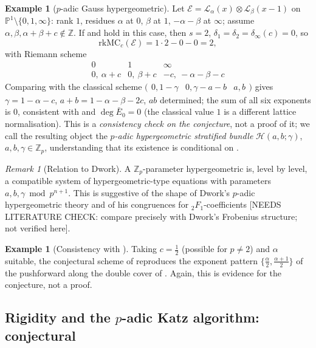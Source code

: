 \documentclass[11pt,reqno]{amsart}
\newcommand{\NEEDSLITERATURECHECK}[1]{{\color{green!40!black}\textsf{[NEEDS
LITERATURE CHECK: #1]}}}
\newcommand{\Zp}{\mathbb{Z}_p}
\newcommand{\ZZ}{\mathbb{Z}}
\newcommand{\PP}{\mathbb{P}}
\newcommand{\cE}{\mathcal{E}}
\newcommand{\cL}{\mathcal{L}}
\newcommand{\cH}{\mathcal{H}}
\newcommand{\rk}{\mathrm{rk}}
\newcommand{\MC}{\mathrm{MC}}
\theoremstyle{plain}
\theoremstyle{definition}
\newtheorem{example}[theorem]{Example}
\theoremstyle{remark}
\newtheorem{remark}[theorem]{Remark}
\numberwithin{equation}{section}
\begin{document}
\begin{example}[$p$-adic Gauss hypergeometric]\label{ex:2F1}
Let $\cE=\cL_{\alpha}(x)\otimes\cL_{\beta}(x-1)$ on
$\PP^1\setminus\{0,1,\infty\}$: rank $1$, residues $\alpha$ at $0$,
$\beta$ at $1$, $-\alpha-\beta$ at $\infty$; assume
$\alpha,\beta,\alpha+\beta+c\notin\ZZ$.  If  and
 hold in this case, then $s=2$,
$\delta_1=\delta_2=\delta_\infty(c)=0$, so
\[
   \rk\MC_c(\cE)=1\cdot2-0-0=2,
\]
with Riemann scheme
\[
   \begin{array}{c|c|c}
   0 & 1 & \infty\\\hline
   0,\ \alpha+c & 0,\ \beta+c & -c,\ -\alpha-\beta-c
   \end{array}
\]
Comparing with the classical scheme
$\bigl(\begin{smallmatrix}0,1-\gamma&0,\gamma-a-b&a,b\end{smallmatrix}\bigr)$
gives $\gamma=1-\alpha-c$, $a+b=1-\alpha-\beta-2c$, $ab$ determined; the
sum of all six exponents is $0$, consistent with
 and $\deg\bar E_0=0$ (the classical value $1$ is a
different lattice normalisation).  This is a \emph{consistency check on
the conjecture}, not a proof of it; we call the resulting object the
\emph{$p$-adic hypergeometric stratified bundle} $\cH(a,b;\gamma)$,
$a,b,\gamma\in\Zp$, understanding that its existence is conditional on
.
\end{example}

\begin{remark}[Relation to Dwork]
A $\Zp$-parameter hypergeometric is, level by level, a compatible system
of hypergeometric-type equations with parameters
$a,b,\gamma\bmod p^{n+1}$.  This is suggestive of the shape of Dwork's
$p$-adic hypergeometric theory and of his congruences for
${}_2F_1$-coefficients \NEEDSLITERATURECHECK{compare precisely with
Dwork's Frobenius structure; not verified here}.
\end{remark}

\begin{example}[Consistency with ]\label{ex:consistent}
Taking $c=\tfrac12$ (possible for $p\ne2$) and $\alpha$ suitable, the
conjectural scheme of  reproduces the exponent pattern
$\{\tfrac\alpha2,\tfrac{\alpha+1}2\}$ of the pushforward along the double
cover of .  Again, this is evidence for the conjecture, not
a proof.
\end{example}

\subsection{Rigidity and the $p$-adic Katz algorithm: conjectural}
\end{document}
